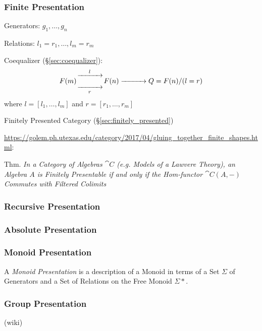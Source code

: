 \subsubsection{Finite Presentation}\label{sec:finite_presentation}
\cite{awodey06}

Generators: $g_1, \ldots, g_n$

Relations: $l_1 = r_1, \ldots, l_m = r_m$

Coequalizer (\S\ref{sec:coequalizer}):
\[
  F(m) {\xrightarrow[\quad\quad\quad]{l}
    \atop \xrightarrow[r]{\quad\quad\quad}} F(n)
  \xrightarrow{\quad\quad\quad} Q = F(n) / (l = r)
\]
where $l = [l_1, \ldots, l_m]$ and $r = [r_1, \ldots, r_m]$

Finitely Presented Category (\S\ref{sec:finitely_presented})

\url{https://golem.ph.utexas.edu/category/2017/04/gluing_together_finite_shapes.html}:

Thm. \emph{In a Category of Algebras $\cat{C}$ (e.g. Models of a
  Lawvere Theory), an Algebra $A$ is Finitely Presentable if and only
  if the Hom-functor $\cat{C}(A,-)$ Commutes with Filtered Colimits}



\subsubsection{Recursive Presentation}\label{sec:recursive_presentation}

\subsubsection{Absolute Presentation}\label{sec:absolute_presentation}

\subsubsection{Monoid Presentation}\label{sec:monoid_presentation}

A \emph{Monoid Presentation} is a description of a Monoid in terms of a Set
$\Sigma$ of Generators and a Set of Relations on the Free Monoid $\Sigma*$.



\subsubsection{Group Presentation}\label{sec:group_presentation}

(wiki)


